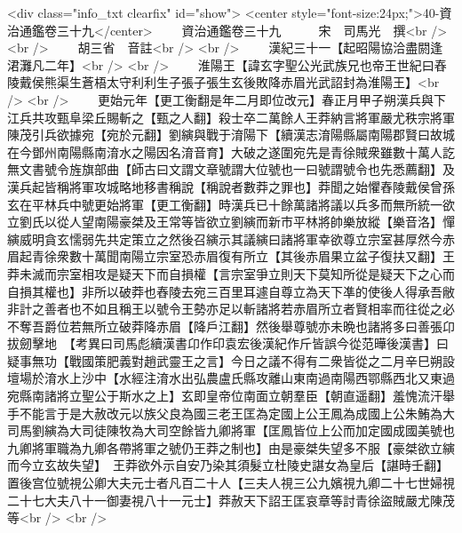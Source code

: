 <div class="info_txt clearfix" id="show">
<center style="font-size:24px;">40-資治通鑑卷三十九</center>
  　　資治通鑑卷三十九　　　宋　司馬光　撰<br />
<br />
　　胡三省　音註<br />
<br />
　　漢紀三十一【起昭陽協洽盡閼逢涒灘凡二年】<br />
<br />
　　淮陽王【諱玄字聖公光武族兄也帝王世紀曰舂陵戴侯熊渠生蒼梧太守利利生子張子張生玄後敗降赤眉光武詔封為淮陽王】<br />
<br />
　　更始元年【更工衡翻是年二月即位改元】春正月甲子朔漢兵與下江兵共攻甄阜梁丘賜斬之【甄之人翻】殺士卒二萬餘人王莽納言將軍嚴尤秩宗將軍陳茂引兵欲據宛【宛於元翻】劉縯與戰于淯陽下【續漢志淯陽縣屬南陽郡賢曰故城在今鄧州南陽縣南淯水之陽因名淯音育】大破之遂圍宛先是青徐賊衆雖數十萬人訖無文書號令旌旗部曲【師古曰文謂文章號謂大位號也一曰號謂號令也先悉薦翻】及漢兵起皆稱將軍攻城略地移書稱說【稱說者數莽之罪也】莽聞之始懼舂陵戴侯曾孫玄在平林兵中號更始將軍【更工衡翻】時漢兵已十餘萬諸將議以兵多而無所統一欲立劉氏以從人望南陽豪桀及王常等皆欲立劉縯而新市平林將帥樂放縱【樂音洛】憚縯威明貪玄懦弱先共定策立之然後召縯示其議縯曰諸將軍幸欲尊立宗室甚厚然今赤眉起青徐衆數十萬聞南陽立宗室恐赤眉復有所立【其後赤眉果立盆子復扶又翻】王莽未滅而宗室相攻是疑天下而自損權【言宗室爭立則天下莫知所從是疑天下之心而自損其權也】非所以破莽也舂陵去宛三百里耳遽自尊立為天下凖的使後人得承吾敝非計之善者也不如且稱王以號令王勢亦足以斬諸將若赤眉所立者賢相率而往從之必不奪吾爵位若無所立破莽降赤眉【降戶江翻】然後舉尊號亦未晩也諸將多曰善張卬拔劒擊地　【考異曰司馬彪續漢書卬作印袁宏後漢紀作斤皆誤今從范曄後漢書】曰疑事無功【戰國策肥義對趙武靈王之言】今日之議不得有二衆皆從之二月辛巳朔設壇場於淯水上沙中【水經注淯水出弘農盧氏縣攻離山東南過南陽西鄂縣西北又東過宛縣南諸將立聖公于斯水之上】玄即皇帝位南面立朝羣臣【朝直遥翻】羞愧流汗舉手不能言于是大赦改元以族父良為國三老王匡為定國上公王鳳為成國上公朱鮪為大司馬劉縯為大司徒陳牧為大司空餘皆九卿將軍【匡鳳皆位上公而加定國成國美號也九卿將軍職為九卿各帶將軍之號仍王莽之制也】由是豪桀失望多不服【豪桀欲立縯而今立玄故失望】　王莽欲外示自安乃染其須髮立杜陵史諶女為皇后【諶時壬翻】置後宫位號視公卿大夫元士者凡百二十人【三夫人視三公九嬪視九卿二十七世婦視二十七大夫八十一御妻視八十一元士】莽赦天下詔王匡哀章等討青徐盜賊嚴尤陳茂等<br />
<br />
